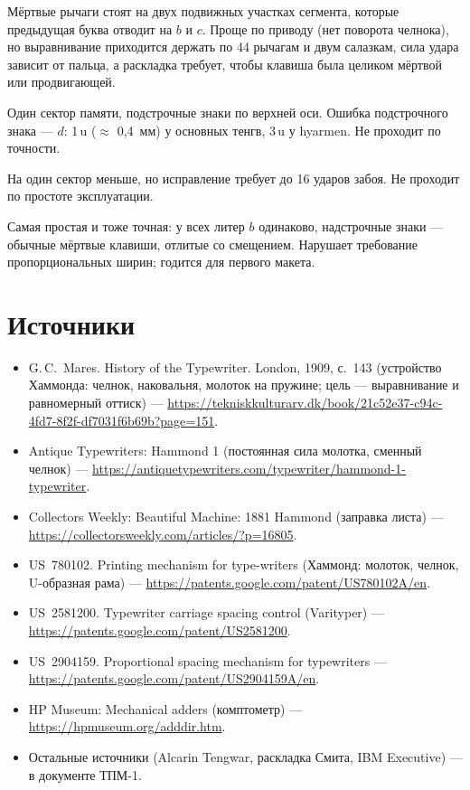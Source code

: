 \begin{description}[style=nextline,leftmargin=0pt]
  \item[Рычажная машинка с салазками знаков (ред. 0.1).] Мёртвые рычаги стоят на двух подвижных участках сегмента, которые предыдущая буква отводит на $b$ и $c$. Проще по приводу (нет поворота челнока), но выравнивание приходится держать по 44 рычагам и двум салазкам, сила удара зависит от пальца, а раскладка требует, чтобы клавиша была целиком мёртвой или продвигающей.
  \item[Без нижней оси.] Один сектор памяти, подстрочные знаки по верхней оси. Ошибка подстрочного знака — $d$: 1\,u ($\approx$ 0,4~мм) у основных тенгв, 3\,u у hyarmen. Не проходит по точности.
  \item[Без «назад на литеру».] На один сектор меньше, но исправление требует до 16 ударов забоя. Не проходит по простоте эксплуатации.
  \item[Моноширинная переделка серийной машинки.] Самая простая и тоже точная: у всех литер $b$ одинаково, надстрочные знаки — обычные мёртвые клавиши, отлитые со смещением. Нарушает требование пропорциональных ширин; годится для первого макета.
\end{description}

\section*{Источники}
\begin{itemize}\small
  \item G.\,C.~Mares. History of the Typewriter. London, 1909, с.~143 (устройство Хаммонда: челнок, наковальня, молоток на пружине; цель — выравнивание и равномерный оттиск) — \url{https://tekniskkulturarv.dk/book/21c52e37-c94c-4fd7-8f2f-df7031f6b69b?page=151}.
  \item Antique Typewriters: Hammond 1 (постоянная сила молотка, сменный челнок) — \url{https://antiquetypewriters.com/typewriter/hammond-1-typewriter}.
  \item Collectors Weekly: Beautiful Machine: 1881 Hammond (заправка листа) — \url{https://collectorsweekly.com/articles/?p=16805}.
  \item US~780102. Printing mechanism for type-writers (Хаммонд: молоток, челнок, U-образная рама) — \url{https://patents.google.com/patent/US780102A/en}.
  \item US~2581200. Typewriter carriage spacing control (Varityper) — \url{https://patents.google.com/patent/US2581200}.
  \item US~2904159. Proportional spacing mechanism for typewriters — \url{https://patents.google.com/patent/US2904159A/en}.
  \item HP Museum: Mechanical adders (комптометр) — \url{https://hpmuseum.org/adddir.htm}.
  \item Остальные источники (Alcarin Tengwar, раскладка Смита, IBM Executive) — в документе ТПМ-1.
\end{itemize}


